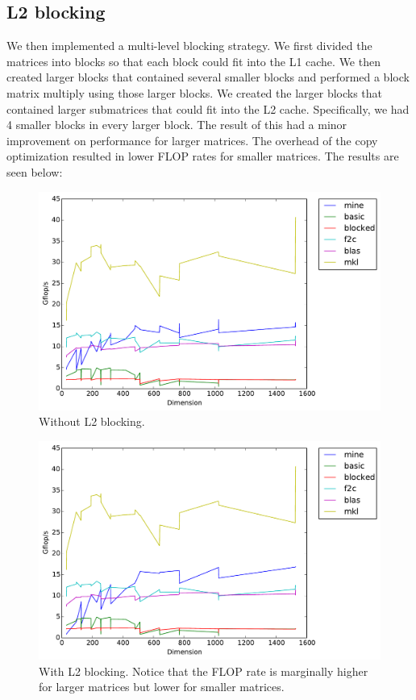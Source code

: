 \documentclass[11pt]{article}
\begin{document}
        \clearpage  
        

        \subsection{L2 blocking}

        We then implemented a multi-level blocking strategy. We first divided the matrices into blocks so that each block could fit into the L1 cache. We then created larger blocks that contained several smaller blocks and performed a block matrix multiply using those larger blocks. We created the larger blocks that contained larger submatrices that could fit into the L2 cache.  Specifically, we had 4 smaller blocks in every larger block. The result of this had a minor improvement on performance for larger matrices. The overhead of the copy optimization resulted in lower FLOP rates for smaller matrices. The results are seen below:
        \begin{figure}[H]
            \centering
            \includegraphics[width=4.5in]{timing_noL2.pdf}
            \caption{Without L2 blocking.}
        \end{figure}

        \begin{figure}[H]
            \centering
            \includegraphics[width=4.5in]{timing_L2.pdf}
            \caption{With L2 blocking. Notice that the FLOP rate is marginally higher for larger matrices but lower for smaller matrices.}
        \end{figure}
\end{document}
